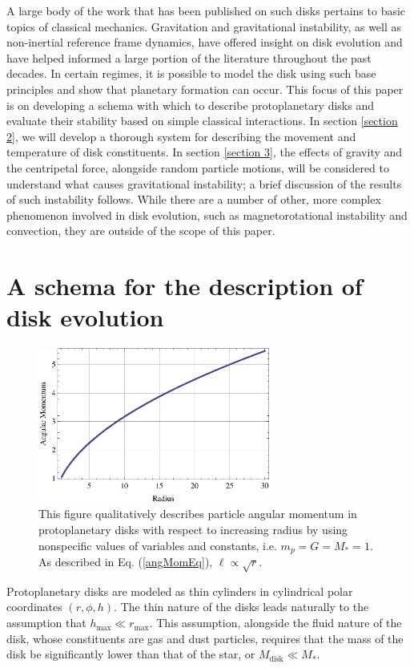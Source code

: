 \documentclass[aps,pra, twocolumn]{revtex4-1}
\begin{document}
A large body of the work that has been published on such disks pertains to basic topics of classical mechanics.  Gravitation and gravitational instability, as well as non-inertial reference frame dynamics, have offered insight on disk evolution and have helped informed a large portion of the literature throughout the past decades.  In certain regimes, it is possible to model the disk using such base principles and show that planetary formation can occur.  This focus of this paper is on developing a schema with which to describe protoplanetary disks and evaluate their stability based on simple classical interactions.  In section \ref{section 2}, we will develop a thorough system for describing the movement and temperature of disk constituents.  In section \ref{section 3}, the effects of gravity and the centripetal force, alongside random particle motions, will be considered to understand what causes gravitational instability; a brief discussion of the results of such instability follows.  While there are a number of other, more complex phenomenon involved in disk evolution, such as magnetorotational instability and convection, they are outside of the scope of this paper.



\section{\label{section 2} A schema for the description of disk evolution}
\begin{figure} [b!]
	\includegraphics[width=3in]{angularMomentum.eps}
	\caption{This figure qualitatively describes particle angular momentum in protoplanetary disks with respect to increasing radius by using nonspecific values of variables and constants, i.e. $m_p = G = M_* = 1$.  As described in Eq. (\ref{angMomEq}), $\ell \propto \sqrt{r}$. \label{angMom}}
\end{figure}


Protoplanetary disks are modeled as thin cylinders in cylindrical polar coordinates $(r, \phi, h)$.  The thin nature of the disks leads naturally to the assumption that $h_{\text{max}} \ll r_{\text{max}}$.  This assumption, alongside the fluid nature of the disk, whose constituents are gas and dust particles, requires that the mass of the disk be significantly lower than that of the star, or $M_{\text{disk}} \ll M_{*}$.  
\end{document}
